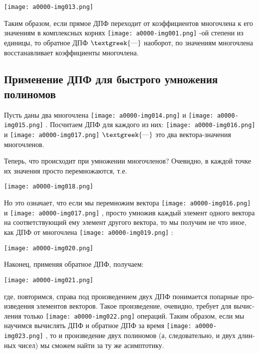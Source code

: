 \documentclass[a4paper]{article}
\begin{document}
 \texttt{[image: a0000-img013.png]} 

\foreignlanguage{russian}{Таким образом, если прямое ДПФ переходит от коэффициентов многочлена к его значениям в
комплексных корнях } \texttt{[image: a0000-img001.png]} \foreignlanguage{russian}{{}-ой
степени из единицы, то обратное ДПФ $\text{\textgreek{—}}$ наоборот, по значениям многочлена восстанавливает
коэффициенты многочлена.}

\subsection[Применение ДПФ для быстрого умножения полиномов ]{ Применение ДПФ для быстрого
умножения полиномов }
\foreignlanguage{russian}{Пусть даны два многочлена } \texttt{[image: a0000-img014.png]}
\foreignlanguage{russian}{и } \texttt{[image: a0000-img015.png]}
\foreignlanguage{russian}{. Посчитаем ДПФ для каждого из них: }
\texttt{[image: a0000-img016.png]} \foreignlanguage{russian}{и }
\texttt{[image: a0000-img017.png]} \foreignlanguage{russian}{$\text{\textgreek{—}}$ это
два вектора-значения многочленов.}

{
Теперь, что происходит при умножении многочленов? Очевидно, в каждой точке их значения просто перемножаются, т.е.}

 \texttt{[image: a0000-img018.png]} 

\foreignlanguage{russian}{Но это означает, что если мы перемножим вектора }
\texttt{[image: a0000-img016.png]} \foreignlanguage{russian}{и }
\texttt{[image: a0000-img017.png]} \foreignlanguage{russian}{, просто умножив каждый
элемент одного вектора на соответствующий ему элемент другого вектора, то мы получим не что иное, как ДПФ от многочлена
} \texttt{[image: a0000-img019.png]} \foreignlanguage{russian}{:}

 \texttt{[image: a0000-img020.png]} 

{
Наконец, применяя обратное ДПФ, получаем:}

 \texttt{[image: a0000-img021.png]} 

\foreignlanguage{russian}{где, повторимся, справа под произведением двух ДПФ понимается попарные произведения элементов
векторов. Такое произведение, очевидно, требует для вычисления только }
\texttt{[image: a0000-img022.png]} \foreignlanguage{russian}{операций. Таким образом, если
мы научимся вычислять ДПФ и обратное ДПФ за время } \texttt{[image: a0000-img023.png]}
\foreignlanguage{russian}{, то и произведение двух полиномов (а, следовательно, и двух длинных чисел) мы сможем найти
за ту же асимптотику.}
\end{document}
